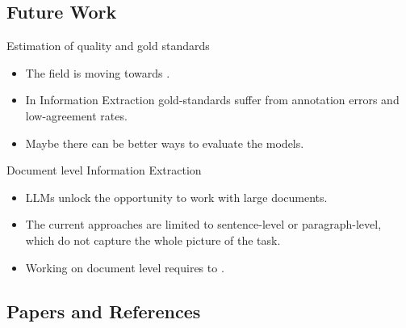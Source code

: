 \documentclass[
    11pt,
    notheorems,
    xcolor={dvipsnames},
    hyperref={
        pdfstartview=FitH, 
        pdftitle={Ikasketa-adibide urriko Informazio-Erauzketa}, 
        pdfauthor={Oscar Sainz Jimenez}, 
        citecolor=secondary, 
    }
]{beamer}
\begin{document}
\subsection{Future Work}

\begin{frame}

     {
        \begin{block}{Estimation of quality and gold standards}
            \begin{itemize}
                \item The field is moving towards .
                \item In Information Extraction gold-standards suffer from annotation errors and low-agreement rates.
                \item Maybe there can be better ways to evaluate the models.
            \end{itemize}
        \end{block}
    }

     {
        \begin{block}{Document level Information Extraction}
            \begin{itemize}
                \item LLMs unlock the opportunity to work with large documents.
                \item The current approaches are limited to sentence-level or paragraph-level, which do not capture the whole picture of the task.
                \item Working on document level requires to .
            \end{itemize}
        \end{block}
    }

\end{frame}

\subsection{Papers and References}
\end{document}
